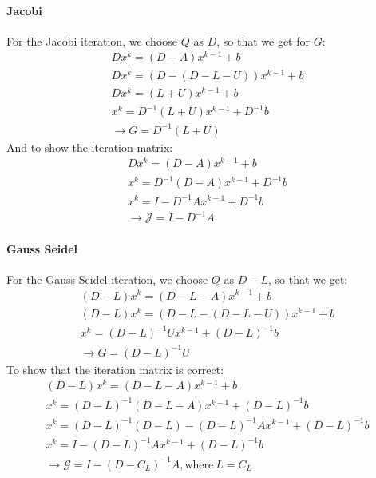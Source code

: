 \paragraph{Jacobi}
For the Jacobi iteration, we choose $Q$ as $D$, so that we get for $G$:
\begin{gather*}
Dx^k = (D-A)x^{k-1} + b \\
Dx^k = (D-(D-L-U)) x^{k-1} + b \\
Dx^k = (L+U) x^{k-1} + b\\
x^k = D^{-1}(L+U) x^{k-1} + D^{-1} b \\
\rightarrow G = D^{-1}(L+U)
\end{gather*}
And to show the iteration matrix:
\begin{gather*}
Dx^k = (D-A)x^{k-1} + b \\
x^k = D^{-1}(D-A) x^{k-1} + D^{-1}b \\
x^k = I - D^{-1}A x^{k-1} + D^{-1}b\\
\rightarrow \mathcal{J} = I - D^{-1}A
\end{gather*}

\paragraph{Gauss Seidel}
For the Gauss Seidel iteration, we choose $Q$ as $D-L$, so that we get:
\begin{gather*}
(D-L)x^k = (D-L-A) x^{k-1} + b \\
(D-L)x^k = (D-L-(D-L-U)) x^{k-1} + b \\
x^k = (D-L)^{-1}U x^{k-1} + (D-L)^{-1}b \\
\rightarrow G = (D-L)^{-1}U
\end{gather*}
To show that the iteration matrix is correct:
\begin{gather*}
(D-L)x^k = (D-L-A) x^{k-1} + b \\
x^k = (D-L)^{-1} (D-L-A) x^{k-1} + (D-L)^{-1}b\\
x^k = (D-L)^{-1} (D-L) - (D-L)^{-1} A x^{k-1} + (D-L)^{-1}b\\
x^k = I - (D-L)^{-1} A x^{k-1} + (D-L)^{-1}b \\
\rightarrow \mathcal{G} = I - (D-C_L)^{-1} A , \text{where}\ L = C_L
\end{gather*}


